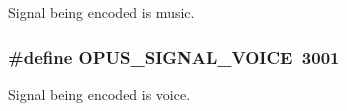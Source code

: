 Signal being encoded is music. \hypertarget{group__opus__ctlvalues_ga085a116fed816373d3b9eae28df49404}{
\subsubsection[{OPUS\_\-SIGNAL\_\-VOICE}]{\setlength{\rightskip}{0pt plus 5cm}\#define OPUS\_\-SIGNAL\_\-VOICE~3001}}
\label{group__opus__ctlvalues_ga085a116fed816373d3b9eae28df49404}


Signal being encoded is voice. 